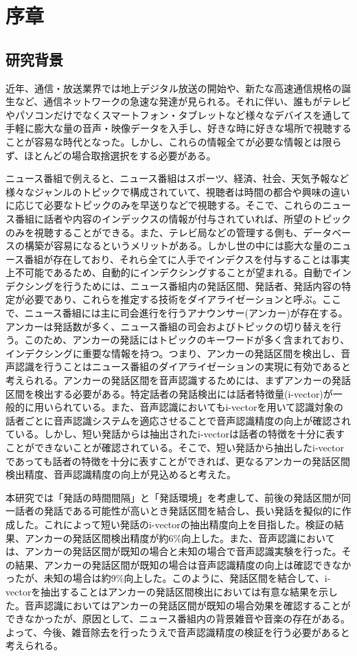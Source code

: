 \chapter{序章}
\section{研究背景}
近年、通信・放送業界では地上デジタル放送の開始や、新たな高速通信規格の誕生など、通信ネットワークの急速な発達が見られる。それに伴い、誰もがテレビやパソコンだけでなくスマートフォン・タブレットなど様々なデバイスを通して手軽に膨大な量の音声・映像データを入手し、好きな時に好きな場所で視聴することが容易な時代となった。しかし、これらの情報全てが必要な情報とは限らず、ほとんどの場合取捨選択をする必要がある。\par
ニュース番組で例えると、ニュース番組はスポーツ、経済、社会、天気予報など様々なジャンルのトピックで構成されていて、視聴者は時間の都合や興味の違いに応じて必要なトピックのみを早送りなどで視聴する。そこで、これらのニュース番組に話者や内容のインデックスの情報が付与されていれば、所望のトピックのみを視聴することができる。また、テレビ局などの管理する側も、データベースの構築が容易になるというメリットがある。しかし世の中には膨大な量のニュース番組が存在しており、それら全てに人手でインデクスを付与することは事実上不可能であるため、自動的にインデクシングすることが望まれる。自動でインデクシングを行うためには、ニュース番組内の発話区間、発話者、発話内容の特定が必要であり、これらを推定する技術をダイアライゼーションと呼ぶ。ここで、ニュース番組には主に司会進行を行うアナウンサー(アンカー)が存在する。アンカーは発話数が多く、ニュース番組の司会およびトピックの切り替えを行う。このため、アンカーの発話にはトピックのキーワードが多く含まれており、インデクシングに重要な情報を持つ。つまり、アンカーの発話区間を検出し、音声認識を行うことはニュース番組のダイアライゼーションの実現に有効であると考えられる。アンカーの発話区間を音声認識するためには、まずアンカーの発話区間を検出する必要がある。特定話者の発話検出には話者特徴量(i-vector)が一般的に用いられている\cite{ogawa_ivector}。また、音声認識においてもi-vectorを用いて認識対象の話者ごとに音声認識システムを適応させることで音声認識精度の向上が確認されている。しかし、短い発話からは抽出されたi-vectorは話者の特徴を十分に表すことができない\cite{panaiv}ことが確認されている。そこで、短い発話から抽出したi-vectorであっても話者の特徴を十分に表すことができれば、更なるアンカーの発話区間検出精度、音声認識精度の向上が見込めると考えた。\par
本研究では「発話の時間間隔」と「発話環境」を考慮して、前後の発話区間が同一話者の発話である可能性が高いとき発話区間を結合し、長い発話を擬似的に作成した。これによって短い発話のi-vectorの抽出精度向上を目指した。検証の結果、アンカーの発話区間検出精度が約6\%向上した。また、音声認識においては、アンカーの発話区間が既知の場合と未知の場合で音声認識実験を行った。その結果、アンカーの発話区間が既知の場合は音声認識精度の向上は確認できなかったが、未知の場合は約9\%向上した。このように、発話区間を結合して、i-vectorを抽出することはアンカーの発話区間検出においては有意な結果を示した。音声認識においてはアンカーの発話区間が既知の場合効果を確認することができなかったが、原因として、ニュース番組内の背景雑音や音楽の存在がある。よって、今後、雑音除去を行ったうえで音声認識精度の検証を行う必要があると考えられる。